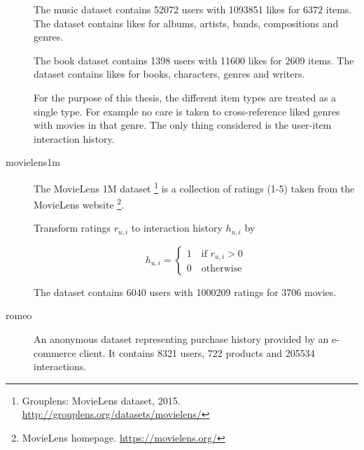 \begin{description}
        The music dataset contains 52072 users with 1093851 likes for 6372 items. The dataset contains likes for albums, artists, bands, compositions and genres.

        The book dataset contains 1398 users with 11600 likes for 2609 items. The dataset contains likes for books, characters, genres and writers.

        For the purpose of this thesis, the different item types are treated as a single type. For example no care is taken to cross-reference liked genres with movies in that genre. The only thing considered is the user-item interaction history.





    \item[movielens1m] \hfill

        The MovieLens 1M dataset \footnote{Grouplens: MovieLens dataset, 2015. \url{http://grouplens.org/datasets/movielens/}} is a collection of ratings (1-5) taken from the MovieLens website \footnote{MovieLens homepage. \url{https://movielens.org/}}.

        Transform ratings $r_{u, i}$ to interaction history $h_{u, i}$ by

        \begin{equation}
            h_{u, i} = \begin{cases}
                1 \quad \text{if } r_{u, i} > 0 \\
                0 \quad \text{otherwise}
            \end{cases}
        \end{equation}

        The dataset contains 6040 users with 1000209 ratings for 3706 movies.



    \item[romeo] \hfill

        An anonymous dataset representing purchase history provided by an e-commerce client. It contains 8321 users, 722 products and 205534 interactions.




\end{description}

